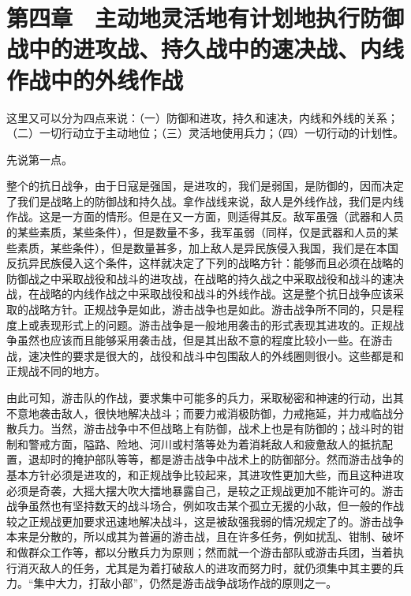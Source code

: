 \section{第四章　主动地灵活地有计划地执行防御战中的进攻战、持久战中的速决战、内线作战中的外线作战}

这里又可以分为四点来说：（一）防御和进攻，持久和速决，内线和外线的关系；（二）一切行动立于主动地位；（三）灵活地使用兵力；（四）一切行动的计划性。

先说第一点。

整个的抗日战争，由于日寇是强国，是进攻的，我们是弱国，是防御的，因而决定了我们是战略上的防御战和持久战。拿作战线来说，敌人是外线作战，我们是内线作战。这是一方面的情形。但是在又一方面，则适得其反。敌军虽强（武器和人员的某些素质，某些条件），但是数量不多，我军虽弱（同样，仅是武器和人员的某些素质，某些条件），但是数量甚多，加上敌人是异民族侵入我国，我们是在本国反抗异民族侵入这个条件，这样就决定了下列的战略方针：能够而且必须在战略的防御战之中采取战役和战斗的进攻战，在战略的持久战之中采取战役和战斗的速决战，在战略的内线作战之中采取战役和战斗的外线作战。这是整个抗日战争应该采取的战略方针。正规战争是如此，游击战争也是如此。游击战争所不同的，只是程度上或表现形式上的问题。游击战争是一般地用袭击的形式表现其进攻的。正规战争虽然也应该而且能够采用袭击战，但是其出敌不意的程度比较小一些。在游击战，速决性的要求是很大的，战役和战斗中包围敌人的外线圈则很小。这些都是和正规战不同的地方。

由此可知，游击队的作战，要求集中可能多的兵力，采取秘密和神速的行动，出其不意地袭击敌人，很快地解决战斗；而要力戒消极防御，力戒拖延，并力戒临战分散兵力。当然，游击战争中不但战略上有防御，战术上也是有防御的；战斗时的钳制和警戒方面，隘路、险地、河川或村落等处为着消耗敌人和疲惫敌人的抵抗配置，退却时的掩护部队等等，都是游击战争中战术上的防御部分。然而游击战争的基本方针必须是进攻的，和正规战争比较起来，其进攻性更加大些，而且这种进攻必须是奇袭，大摇大摆大吹大擂地暴露自己，是较之正规战更加不能许可的。游击战争虽然也有坚持数天的战斗场合，例如攻击某个孤立无援的小敌，但一般的作战较之正规战更加要求迅速地解决战斗，这是被敌强我弱的情况规定了的。游击战争本来是分散的，所以成其为普遍的游击战，且在许多任务，例如扰乱、钳制、破坏和做群众工作等，都以分散兵力为原则；然而就一个游击部队或游击兵团，当着执行消灭敌人的任务，尤其是为着打破敌人的进攻而努力时，就仍须集中其主要的兵力。“集中大力，打敌小部”，仍然是游击战争战场作战的原则之一。

